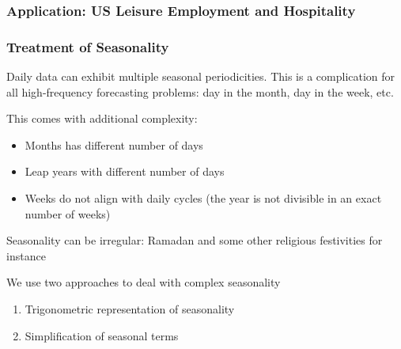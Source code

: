 \documentclass{beamer}
\newenvironment{wideitemize}{\itemize\addtolength{\itemsep}{10pt}}{\enditemize}
\begin{document}
\begin{frame}
  \frametitle{Application:  US Leisure Employment and Hospitality}
\end{frame}



\begin{frame}
  \frametitle{Treatment of Seasonality}

  \begin{wideitemize}
    \item Daily data can exhibit multiple seasonal periodicities. This is a complication for all high-frequency forecasting problems: day in the month, day in the week, etc.
    \item This comes with additional complexity:
      \begin{itemize}
        \item Months has different number of days
        \item Leap years with different number of days
        \item Weeks do not align with daily cycles (the year is not divisible in an exact number of weeks)
        \end{itemize}
      \item Seasonality can be irregular: Ramadan and some other religious festivities for instance
      \item We use two approaches to deal with complex seasonality
        \begin{enumerate}
        \item Trigonometric representation of seasonality
        \item Simplification of seasonal terms
        \end{enumerate}
  \end{wideitemize}
  
\end{frame}
\end{document}
